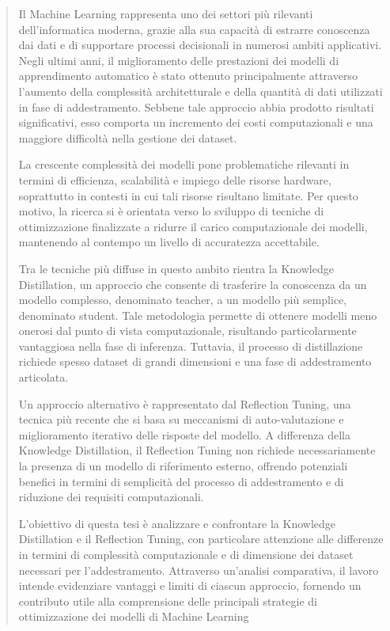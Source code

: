 
\begin{abstract}
Il Machine Learning rappresenta uno dei settori più rilevanti dell’informatica moderna, grazie alla sua capacità di estrarre conoscenza dai dati e di supportare processi decisionali in numerosi ambiti applicativi. Negli ultimi anni, il miglioramento delle prestazioni dei modelli di apprendimento automatico è stato ottenuto principalmente attraverso l’aumento della complessità architetturale e della quantità di dati utilizzati in fase di addestramento. Sebbene tale approccio abbia prodotto risultati significativi, esso comporta un incremento dei costi computazionali e una maggiore difficoltà nella gestione dei dataset.

La crescente complessità dei modelli pone problematiche rilevanti in termini di efficienza, scalabilità e impiego delle risorse hardware, soprattutto in contesti in cui tali risorse risultano limitate. Per questo motivo, la ricerca si è orientata verso lo sviluppo di tecniche di ottimizzazione finalizzate a ridurre il carico computazionale dei modelli, mantenendo al contempo un livello di accuratezza accettabile.

Tra le tecniche più diffuse in questo ambito rientra la Knowledge Distillation, un approccio che consente di trasferire la conoscenza da un modello complesso, denominato teacher, a un modello più semplice, denominato student. Tale metodologia permette di ottenere modelli meno onerosi dal punto di vista computazionale, risultando particolarmente vantaggiosa nella fase di inferenza. Tuttavia, il processo di distillazione richiede spesso dataset di grandi dimensioni e una fase di addestramento articolata.

Un approccio alternativo è rappresentato dal Reflection Tuning, una tecnica più recente che si basa su meccanismi di auto-valutazione e miglioramento iterativo delle risposte del modello. A differenza della Knowledge Distillation, il Reflection Tuning non richiede necessariamente la presenza di un modello di riferimento esterno, offrendo potenziali benefici in termini di semplicità del processo di addestramento e di riduzione dei requisiti computazionali.

L’obiettivo di questa tesi è analizzare e confrontare la Knowledge Distillation e il Reflection Tuning, con particolare attenzione alle differenze in termini di complessità computazionale e di dimensione dei dataset necessari per l’addestramento. Attraverso un’analisi comparativa, il lavoro intende evidenziare vantaggi e limiti di ciascun approccio, fornendo un contributo utile alla comprensione delle principali strategie di ottimizzazione dei modelli di Machine Learning

\end{abstract}
